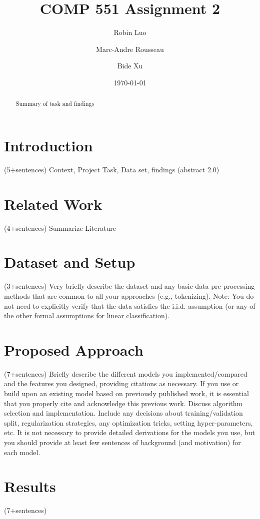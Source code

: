 \documentclass{amsart}
\theoremstyle{definition}
\theoremstyle{remark}
\numberwithin{equation}{section}
\begin{document}
\vspace*{-80pt}

\title{COMP 551 Assignment 2}

\author{Robin Luo}
\author{Marc-Andre Rousseau}
\author{Bide Xu}
\subjclass[2010]{}
\date{\today}
\begin{abstract}
Summary of task and findings
\end{abstract}
\maketitle
\section{Introduction}(5+sentences)
Context, Project Task, Data set, findings (abstract 2.0)
\section{Related Work}(4+sentences)
Summarize Literature
\section{Dataset and Setup}(3+sentences)
Very briefly describe the dataset and any basic data pre-processing
methods that are common to all your approaches (e.g., tokenizing). Note: You do not need to explicitly verify that the data satisfies the i.i.d. assumption (or any of the other formal assumptions for linear
classification).
\section{Proposed Approach}(7+sentences)
Briefly describe the different models you implemented/compared
and the features you designed, providing citations as necessary. If you use or build upon an existing
model based on previously published work, it is essential that you properly cite and acknowledge this previous work. Discuss algorithm selection and implementation. Include any decisions about
training/validation split, regularization strategies, any optimization tricks, setting hyper-parameters, etc. It
is not necessary to provide detailed derivations for the models you use, but you should provide at least few
sentences of background (and motivation) for each model.
\section{Results} (7+sentences)
\end{document}
